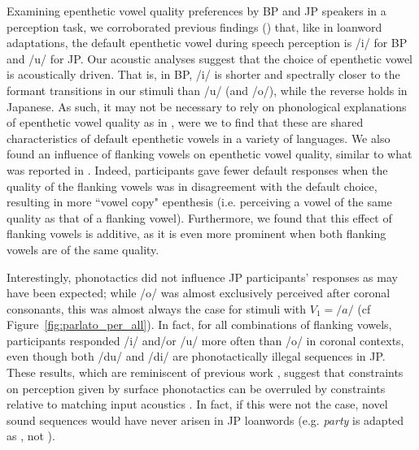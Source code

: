 Examining epenthetic vowel quality preferences by BP and JP speakers in a perception task, we corroborated previous findings (\cite{dupoux1999, dupoux2011}) that, like in loanword adaptations, the default epenthetic vowel during speech perception is /i/ for BP and /u/ for JP. Our acoustic analyses suggest that the choice of epenthetic vowel is acoustically driven. That is, in BP, /i/ is shorter and spectrally closer to the formant transitions in our stimuli than /u/ (and /o/), while the reverse holds in Japanese. As such, it may not be necessary to rely on phonological explanations of epenthetic vowel quality as in \cite{rose2006, uffmann2006}, were we to find that these are shared characteristics of default epenthetic vowels in a variety of languages. We also found an influence of flanking vowels on epenthetic vowel quality, similar to what was reported in \cite{dupoux2011}. Indeed, participants gave fewer default responses when the quality of the flanking vowels was in disagreement with the default choice, resulting in more ``vowel copy" epenthesis (i.e. perceiving a vowel of the same quality as that of a flanking vowel). Furthermore, we found that this effect of flanking vowels is additive, as it is even more prominent when both flanking vowels are of the same quality. 

Interestingly, phonotactics did not influence JP participants' responses as may have been expected; while /o/ was almost exclusively perceived after coronal consonants, this was almost always the case for stimuli with $V_{1} = /a/$ (cf Figure~\ref{fig:parlato_per_all}). In fact, for all combinations of flanking vowels, participants responded /i/ and/or /u/ more often than /o/ in coronal contexts, even though both /du/ and /di/ are phonotactically illegal sequences in JP. These results, which are reminiscent of previous work \cite{monahan2009, mattingley2015}, suggest that constraints on perception given by surface phonotactics can be overruled by constraints relative to matching input acoustics \cite{dupoux2011}. In fact, if this were not the case, novel sound sequences would have never arisen in JP loanwords (e.g. \textit{party} is adapted as , not ). 

